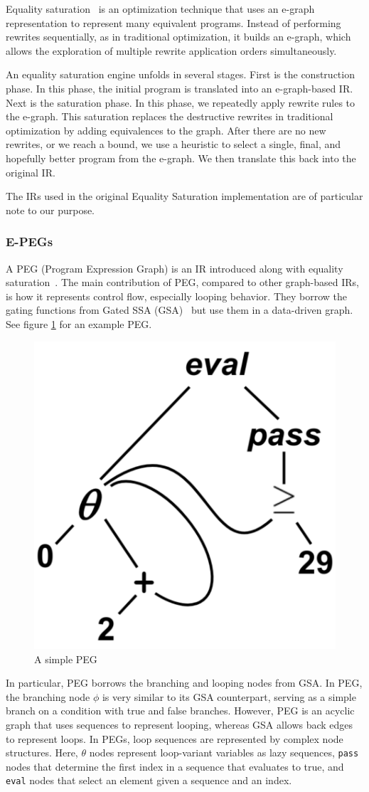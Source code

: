 \documentclass{article}
\begin{document}
Equality saturation~\cite{eqsat-lmcs} is an optimization technique that uses an e-graph representation to represent many equivalent programs. Instead of performing rewrites sequentially, as in traditional optimization, it builds an e-graph, which allows the exploration of multiple rewrite application orders simultaneously.

An equality saturation engine unfolds in several stages. First is the construction phase. In this phase, the initial program is translated into an e-graph-based IR. Next is the saturation phase. In this phase, we repeatedly apply rewrite rules to the e-graph. This saturation replaces the destructive rewrites in traditional optimization by adding equivalences to the graph. After there are no new rewrites, or we reach a bound, we use a heuristic to select a single, final, and hopefully better program from the e-graph. We then translate this back into the original IR.

The IRs used in the original Equality Saturation implementation are of particular note to our purpose. 


\subsubsection{E-PEGs}

A PEG (Program Expression Graph) is an IR introduced along with equality saturation~\cite{eqsat-lmcs}. The main contribution of PEG, compared to other graph-based IRs, is how it represents control flow, especially looping behavior. They borrow the gating functions from Gated SSA (GSA)~\cite{Stanier2022} but use them in a data-driven graph. See figure \ref{fig:peg} for an example PEG.

\begin{figure}
    \centering
    \includegraphics[width=0.25\linewidth]{assets/peg.png}
    \caption{A simple PEG~\cite{eqsat-lmcs}}
    \label{fig:peg}
\end{figure}

In particular, PEG borrows the branching and looping nodes from GSA. In PEG, the branching node $\phi$ is very similar to its GSA counterpart, serving as a simple branch on a condition with true and false branches. However, PEG is an acyclic graph that uses sequences to represent looping, whereas GSA allows back edges to represent loops. In PEGs, loop sequences are represented by complex node structures. Here, $\theta$ nodes represent loop-variant variables as lazy sequences, \verb|pass| nodes that determine the first index in a sequence that evaluates to true, and \verb|eval| nodes that select an element given a sequence and an index.
\end{document}
